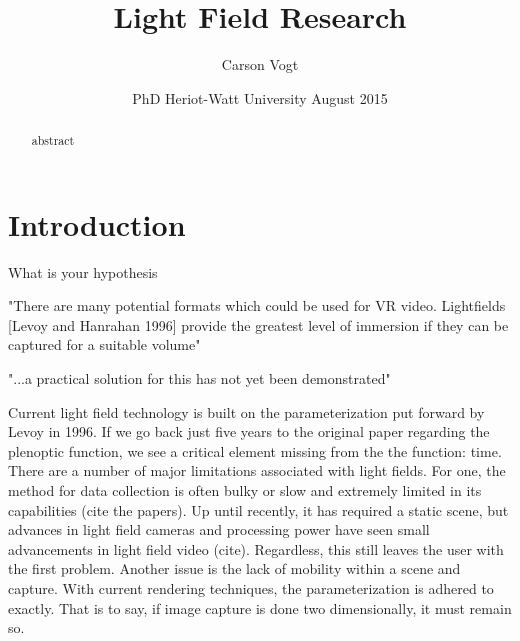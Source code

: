 \documentclass[12pt]{report}
\begin{document}
\title{Light Field Research \vspace{2.5cm}}	%
\author{
\Large Carson Vogt \vspace{1cm} \\ 
}

\date{
	\centering
	PhD \endgraf\medskip
	Heriot-Watt University \endgraf{} August 2015
}

\maketitle

\begin{abstract}
\begin{small}
abstract
\end{small}
\end{abstract}

\listoffigures

\tableofcontents

\chapter*{Introduction}
What is your hypothesis

"There are many potential formats which could be used for VR video.
Lightfields [Levoy and Hanrahan 1996] provide the greatest level of
immersion if they can be captured for a suitable volume"

"...a practical solution for this has not yet been demonstrated"

Current light field technology is built on the parameterization put forward by Levoy in 1996. If we go back just five years to the original paper regarding the plenoptic function, we see a critical element missing from the the function: time. There are a number of major limitations associated with light fields. For one, the method for data collection is often bulky or slow and extremely limited in its capabilities (cite the papers). Up until recently, it has required a static scene, but advances in light field cameras and processing power have seen small advancements in light field video (cite). Regardless, this still leaves the user with the first problem. Another issue is the lack of mobility within a scene and capture. With current rendering techniques, the parameterization is adhered to exactly. That is to say, if image capture is done two dimensionally, it must remain so. 
\end{document}
